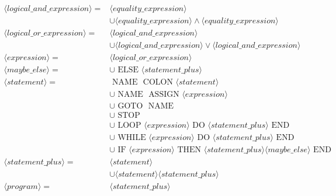 \documentclass[letterpaper,11pt]{article}
\begin{document}
{{{\begin{align*}
				\langle \textit{logical\_and\_expression} \rangle =
					& \langle \textit{equality\_expression} \rangle\\
					& \cup \langle \textit{equality\_expression} \rangle \land \langle \textit{equality\_expression} \rangle\\
				\langle \textit{logical\_or\_expression} \rangle =
					& \langle \textit{logical\_and\_expression} \rangle\\
					& \cup \langle \textit{logical\_and\_expression} \rangle \lor \langle \textit{logical\_and\_expression} \rangle\\
				\langle \textit{expression} \rangle = & \langle \textit{logical\_or\_expression} \rangle\\
				\langle \textit{maybe\_else} \rangle =
					& \cup \text{ ELSE } \langle \textit{statement\_plus} \rangle\\
				\langle \textit{statement} \rangle =
					& \text{ NAME } \text{ COLON } \langle \textit{statement} \rangle\\
					& \cup \text{ NAME } \text{ ASSIGN } \langle \textit{expression} \rangle\\
					& \cup \text{ GOTO } \text{ NAME } \\
					& \cup \text{ STOP } \\
					& \cup \text{ LOOP } \langle \textit{expression} \rangle \text{ DO } \langle \textit{statement\_plus} \rangle \text{ END }\\
					& \cup \text{ WHILE } \langle \textit{expression} \rangle \text{ DO } \langle \textit{statement\_plus} \rangle \text{ END }\\
					& \cup \text{ IF } \langle \textit{expression} \rangle \text{ THEN }
						\langle \textit{statement\_plus} \rangle \langle \textit{maybe\_else} \rangle \text{ END }\\
				\langle \textit{statement\_plus} \rangle =
					& \langle \textit{statement} \rangle \\
					& \cup \langle \textit{statement} \rangle \langle \textit{statement\_plus} \rangle\\
				\langle \textit{program} \rangle = &\langle \textit{statement\_plus} \rangle\\
			\end{align*}
			
		}
		
}}
\end{document}
